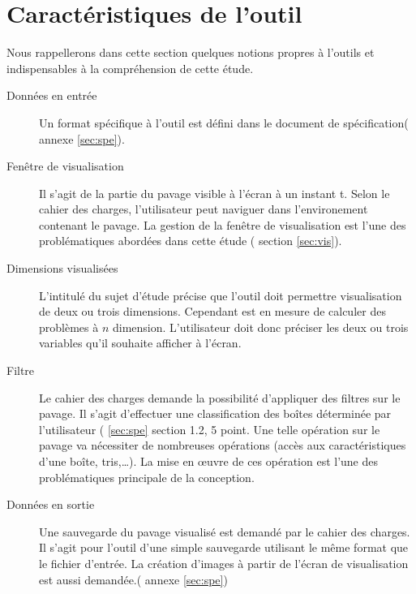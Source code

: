 \section{Caractéristiques de l'outil}
Nous rappellerons dans cette section quelques notions propres à l'outils et indispensables à la compréhension de cette étude.  
\begin{description}
\item[Données en entrée] Un format spécifique à l'outil est défini dans le document de spécification(\cf{} annexe \ref{sec:spe}).
 \item[Fenêtre de visualisation] Il s'agit de la partie du pavage visible à l'écran à un instant t. Selon le cahier des charges, l'utilisateur peut \og naviguer\fg{} dans l'environement contenant le pavage. La gestion de la fenêtre de visualisation est l'une des problématiques abordées dans cette étude (\cf{} section \ref{sec:vis}).
\item[Dimensions visualisées] L'intitulé du sujet d'étude précise que l'outil doit permettre visualisation de deux ou trois dimensions. Cependant \realpaver{} est en mesure de calculer des problèmes à $n$ dimension. L'utilisateur doit donc préciser les deux ou trois variables qu'il souhaite afficher à l'écran.  
\item[Filtre] Le cahier des charges demande la possibilité d'appliquer des filtres sur le pavage. Il s'agit d'effectuer une classification des boîtes déterminée par l'utilisateur (\cf{} \ref{sec:spe} section 1.2, 5 point. Une telle opération sur le pavage va nécessiter de nombreuses opérations (accès aux caractéristiques d'une boîte, tris,\dots). La mise en œuvre de ces opération est l'une des problématiques principale de la conception.    
\item[Données en sortie] Une sauvegarde du pavage visualisé est demandé par le cahier des charges. Il s'agit pour l'outil d'une simple \og sauvegarde \fg{} utilisant le même format que le fichier d'entrée. La création d'images à partir de l'écran de visualisation est aussi demandée.(\cf{} annexe \ref{sec:spe})
\end{description}
